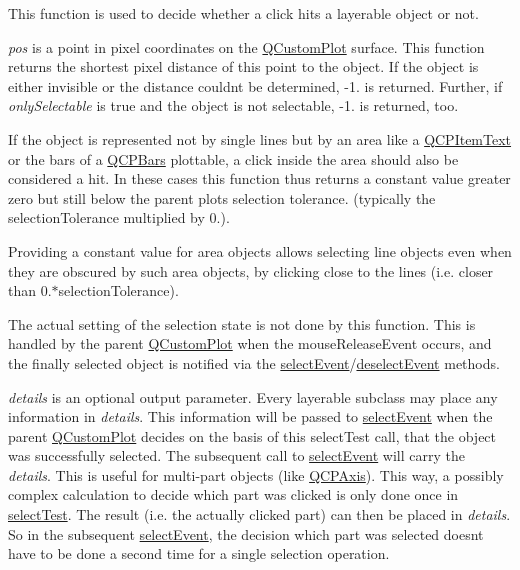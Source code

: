 This function is used to decide whether a click hits a layerable object or not.

{\itshape pos} is a point in pixel coordinates on the \hyperlink{class_q_custom_plot}{Q\+Custom\+Plot} surface. This function returns the shortest pixel distance of this point to the object. If the object is either invisible or the distance couldn\textquotesingle{}t be determined, -\/1. is returned. Further, if {\itshape only\+Selectable} is true and the object is not selectable, -\/1. is returned, too.

If the object is represented not by single lines but by an area like a \hyperlink{class_q_c_p_item_text}{Q\+C\+P\+Item\+Text} or the bars of a \hyperlink{class_q_c_p_bars}{Q\+C\+P\+Bars} plottable, a click inside the area should also be considered a hit. In these cases this function thus returns a constant value greater zero but still below the parent plot\textquotesingle{}s selection tolerance. (typically the selection\+Tolerance multiplied by 0.).

Providing a constant value for area objects allows selecting line objects even when they are obscured by such area objects, by clicking close to the lines (i.\+e. closer than 0.$\ast$selection\+Tolerance).

The actual setting of the selection state is not done by this function. This is handled by the parent \hyperlink{class_q_custom_plot}{Q\+Custom\+Plot} when the mouse\+Release\+Event occurs, and the finally selected object is notified via the \hyperlink{class_q_c_p_abstract_item_aa4b969c58797f39c9c0b6c07c7869d17}{select\+Event}/\hyperlink{class_q_c_p_abstract_item_af9093798cb07a861dcc73f93ca16c0c1}{deselect\+Event} methods.

{\itshape details} is an optional output parameter. Every layerable subclass may place any information in {\itshape details}. This information will be passed to \hyperlink{class_q_c_p_abstract_item_aa4b969c58797f39c9c0b6c07c7869d17}{select\+Event} when the parent \hyperlink{class_q_custom_plot}{Q\+Custom\+Plot} decides on the basis of this select\+Test call, that the object was successfully selected. The subsequent call to \hyperlink{class_q_c_p_abstract_item_aa4b969c58797f39c9c0b6c07c7869d17}{select\+Event} will carry the {\itshape details}. This is useful for multi-\/part objects (like \hyperlink{class_q_c_p_axis}{Q\+C\+P\+Axis}). This way, a possibly complex calculation to decide which part was clicked is only done once in \hyperlink{class_q_c_p_item_ellipse_ab6e2b8a29695c606c7731e498297ca29}{select\+Test}. The result (i.\+e. the actually clicked part) can then be placed in {\itshape details}. So in the subsequent \hyperlink{class_q_c_p_abstract_item_aa4b969c58797f39c9c0b6c07c7869d17}{select\+Event}, the decision which part was selected doesn\textquotesingle{}t have to be done a second time for a single selection operation.

